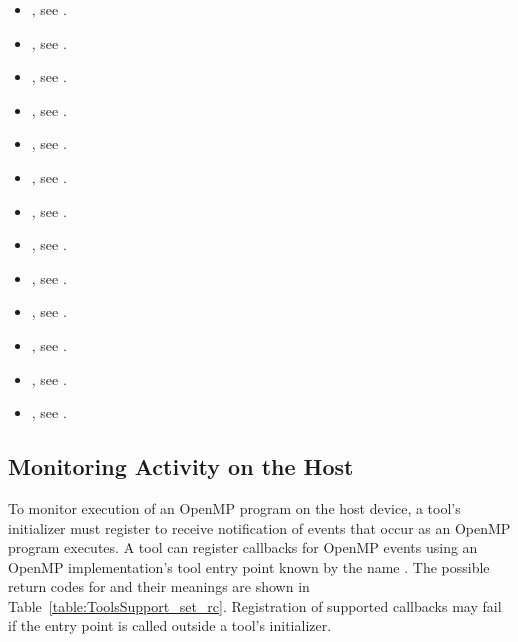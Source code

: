 \crossreferences
\begin{itemize}
\item {}, see .
\item {}, see
  .
\item {}, see .
\item {}, see .
\item {}, see .
\item {}, see .
\item {}, see .
\item {}, see .
\item {}, see .
\item {}, see .
\item {}, see .
\item {}, see .
\item {}, see
  .
\end{itemize}

\subsection{Monitoring Activity on the Host}
\label{sec:ompt-register-callbacks}

To monitor execution of an OpenMP program on the host device, a tool's
initializer must register to receive notification
of events that occur as an OpenMP program executes.  
A tool can register callbacks for OpenMP events using
an OpenMP implementation's tool entry point known by the name
.  The possible return codes for
 and their meanings are shown in
Table~\ref{table:ToolsSupport_set_rc}.  Registration of supported
callbacks may fail if the  entry point is
called outside a tool's initializer.

